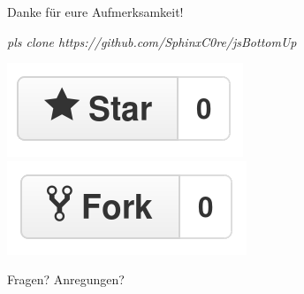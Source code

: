 \documentclass{beamer}
\begin{document}





\begin{frame}
\Huge{\centerline{Danke für eure Aufmerksamkeit!}}

\begin{normalsize}

\centerline{\textit{pls clone https://github.com/SphinxC0re/jsBottomUp}}
\centerline{\includegraphics[scale=0.2]{assets/like_button.png} \includegraphics[scale=0.2]{assets/dislike_button.png}}
\end{normalsize}
\end{frame}

\begin{frame}
\Huge{\centerline{Fragen? Anregungen?}}
\end{frame}

\end{document}
